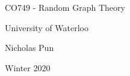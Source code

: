 \documentclass[12pt]{article}
\begin{document}
\begin{titlepage}
  \centering
  \vspace*{2in}
  {\huge CO749 - Random Graph Theory}\par
  \vspace{0.5in}
  {\large University of Waterloo}\par
  {\large Nicholas Pun}\par
  {\large Winter 2020}\par 
 \end{titlepage}
 
\tableofcontents
\clearpage


\end{document}
